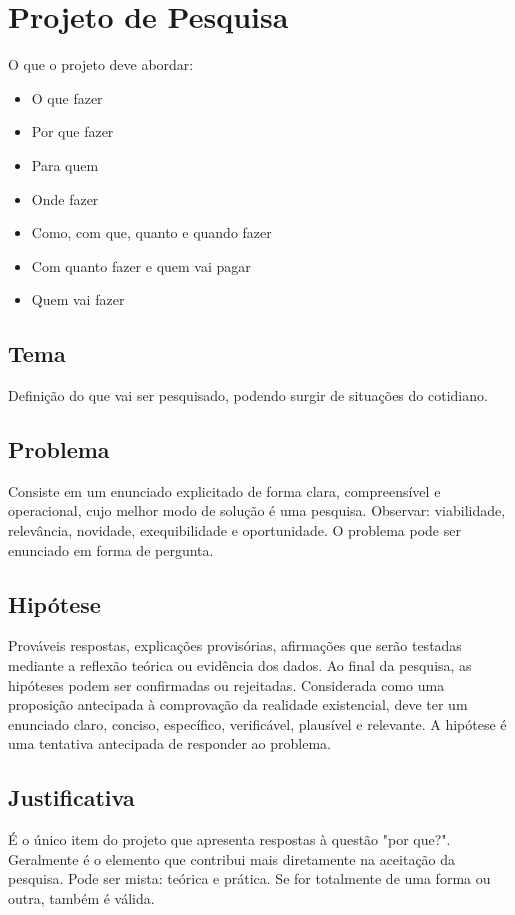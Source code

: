 \section{Projeto de Pesquisa}

    O que o projeto deve abordar:
    \begin{itemize}
        \item O que fazer
        \item Por que fazer
        \item Para quem
        \item Onde fazer
        \item Como, com que, quanto e quando fazer
        \item Com quanto fazer e quem vai pagar
        \item Quem vai fazer
    \end{itemize}

    \subsection{Tema} 
        Definição do que vai ser pesquisado, podendo surgir de situações do cotidiano.

    \subsection{Problema} 
        Consiste em um enunciado explicitado de forma clara, compreensível e operacional, cujo melhor modo de solução é uma pesquisa. Observar: viabilidade, relevância, novidade, exequibilidade e oportunidade. O problema pode ser enunciado em forma de pergunta.

    \subsection{Hipótese} 
        Prováveis respostas, explicações provisórias, afirmações que serão testadas mediante a reflexão teórica ou evidência dos dados. Ao final da pesquisa, as hipóteses podem ser confirmadas ou rejeitadas. Considerada como uma proposição antecipada à comprovação da realidade existencial, deve ter um enunciado claro, conciso, específico, verificável, plausível e relevante. A hipótese é uma tentativa antecipada de responder ao problema.

    \subsection{Justificativa} 
        É o único item do projeto que apresenta respostas à questão "por que?". Geralmente é o elemento que contribui mais diretamente na aceitação da pesquisa. Pode ser mista: teórica e prática. Se for totalmente de uma forma ou outra, também é válida.

